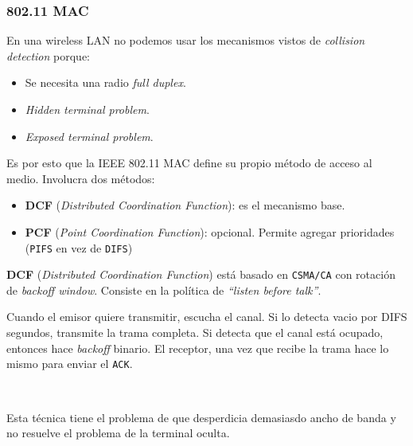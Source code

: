 \documentclass[]{article}
\begin{document}
\subsubsection{802.11 MAC}
En una wireless LAN no podemos usar los mecanismos vistos de \emph{collision detection} porque:
\begin{itemize}
    \item Se necesita una radio \emph{full duplex}.
    \item \emph{Hidden terminal problem}.
    \item \emph{Exposed terminal problem}.
\end{itemize}

Es por esto que la IEEE 802.11 MAC define su propio método de acceso al medio. Involucra dos métodos:

\begin{itemize}
    \item \textbf{DCF} (\emph{Distributed Coordination Function}): es el mecanismo base.
    \item \textbf{PCF} (\emph{Point Coordination Function}): opcional. Permite agregar prioridades (\texttt{PIFS} en vez de \texttt{DIFS})
\end{itemize}



\textbf{DCF} (\emph{Distributed Coordination Function}) está basado en \texttt{CSMA/CA} con rotación de \emph{backoff window}. Consiste en la política de \emph{``listen before talk''}.

Cuando el emisor quiere transmitir, escucha el canal. Si lo detecta vacio por DIFS segundos, transmite la trama completa. Si detecta que el canal está ocupado, entonces hace \emph{backoff} binario. El receptor, una vez que recibe la trama hace lo mismo para enviar el \texttt{ACK}.

~\newline

Esta técnica tiene el problema de que desperdicia demasiasdo ancho de banda y no resuelve el problema de la terminal oculta.
\end{document}
